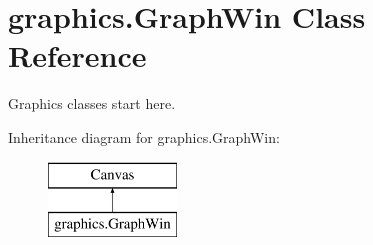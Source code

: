 \hypertarget{classgraphics_1_1_graph_win}{}\section{graphics.\+Graph\+Win Class Reference}
\label{classgraphics_1_1_graph_win}


Graphics classes start here.  


Inheritance diagram for graphics.\+Graph\+Win\+:\begin{figure}[H]
\begin{center}
\leavevmode
\includegraphics[height=2.000000cm]{classgraphics_1_1_graph_win}
\end{center}
\end{figure}
